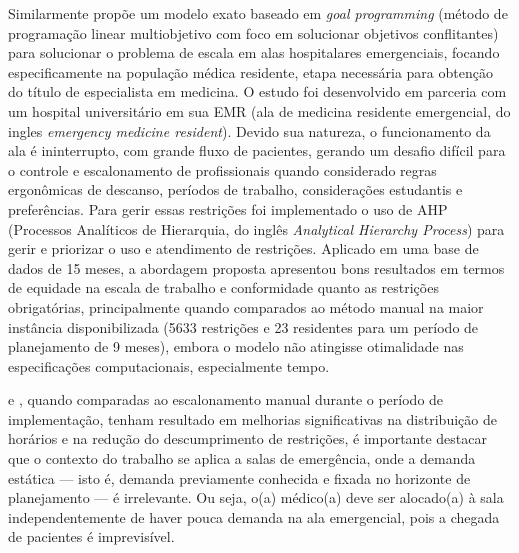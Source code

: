 Similarmente  propõe um modelo exato baseado em \textit{goal programming} (método de programação linear multiobjetivo com foco em solucionar objetivos conflitantes) para solucionar o problema de escala em alas hospitalares emergenciais, focando especificamente na população médica residente, etapa necessária para obtenção do título de especialista em medicina. O estudo foi desenvolvido em parceria com um hospital universitário em sua EMR (ala de medicina residente emergencial, do ingles \textit{emergency medicine resident}). Devido sua natureza, o funcionamento da ala é ininterrupto, com grande fluxo de pacientes, gerando um desafio difícil para o controle e escalonamento de profissionais quando considerado regras ergonômicas de descanso, períodos de trabalho, considerações estudantis e preferências. Para gerir essas restrições foi implementado o uso de AHP (Processos Analíticos de Hierarquia, do inglês \textit{Analytical Hierarchy Process}) para gerir e priorizar o uso e atendimento de restrições.
Aplicado em uma base de dados de 15 meses, a abordagem proposta apresentou bons resultados em termos de equidade na escala de trabalho e conformidade quanto as restrições obrigatórias, principalmente quando comparados ao método manual na maior instância disponibilizada (5633 restrições e 23 residentes para um período de planejamento de 9 meses), embora o modelo não atingisse otimalidade nas especificações computacionais, especialmente tempo.

 e , quando comparadas ao escalonamento manual durante o período de implementação, tenham resultado em melhorias significativas na distribuição de horários e na redução do descumprimento de restrições, é importante destacar que o contexto do trabalho se aplica a salas de emergência, onde a demanda estática — isto é, demanda previamente conhecida e fixada no horizonte de planejamento — é irrelevante. Ou seja, o(a) médico(a) deve ser alocado(a) à sala independentemente de haver pouca demanda na ala emergencial, pois a chegada de pacientes é imprevisível.

